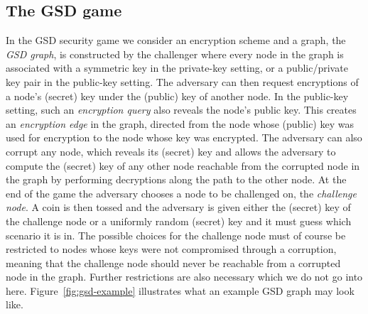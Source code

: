 \subsection{The GSD game}

In the GSD security game we consider an encryption scheme and a graph, the \emph{GSD graph}, is constructed by the challenger where every node in the graph is associated with a symmetric key in the private-key setting, or a public/private key pair in the public-key setting. The adversary can then request encryptions of a node's (secret) key under the (public) key of another node. In the public-key setting, such an \emph{encryption query} also reveals the node's public key. This creates an \emph{encryption edge} in the graph, directed from the node whose (public) key was used for encryption to the node whose key was encrypted. The adversary can also corrupt any node, which reveals its (secret) key and allows the adversary to compute the (secret) key of any other node reachable from the corrupted node in the graph by performing decryptions along the path to the other node. At the end of the game the adversary chooses a node to be challenged on, the \emph{challenge node}. A coin is then tossed and the adversary is given either the (secret) key of the challenge node or a uniformly random (secret) key and it must guess which scenario it is in. The possible choices for the challenge node must of course be restricted to nodes whose keys were not compromised through a corruption, meaning that the challenge node should never be reachable from a corrupted node in the graph. Further restrictions are also necessary which we do not go into here. Figure~\ref{fig:gsd-example} illustrates what an example GSD graph may look like.

